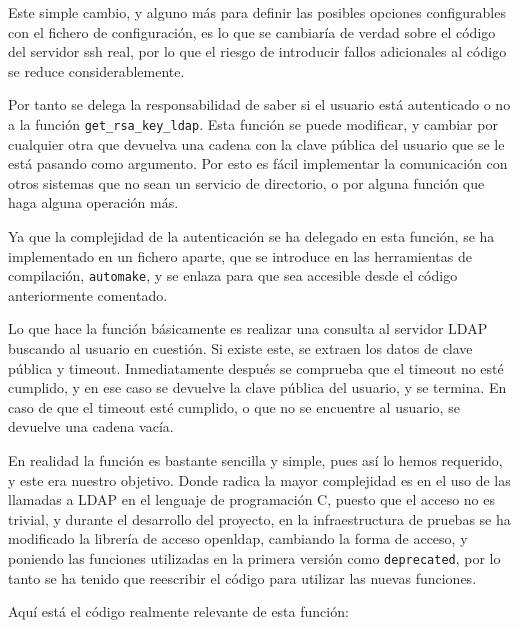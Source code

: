     Este simple cambio, y alguno más para definir las posibles opciones
    configurables con el fichero de configuración, es lo que se cambiaría
    de verdad sobre el código del servidor ssh real, por lo que el riesgo
    de introducir fallos adicionales al código se reduce considerablemente.

    Por tanto se delega la responsabilidad de saber si el usuario está
    autenticado o no a la función \texttt{get\_rsa\_key\_ldap}. Esta
    función se puede modificar, y cambiar por cualquier otra que devuelva
    una cadena con la clave pública del usuario que se le está pasando como
    argumento. Por esto es fácil implementar la comunicación con otros
    sistemas que no sean un servicio de directorio, o por alguna función
    que haga alguna operación más.

    Ya que la complejidad de la autenticación se ha delegado en esta
    función, se ha implementado en un fichero aparte, que se introduce en
    las herramientas de compilación, \texttt{automake}, y se enlaza para
    que sea accesible desde el código anteriormente comentado.

    Lo que hace la función básicamente es realizar una consulta al servidor
    LDAP buscando al usuario en cuestión. Si existe este, se extraen los
    datos de clave pública y timeout. Inmediatamente después se comprueba
    que el timeout no esté cumplido, y en ese caso se devuelve la clave
    pública del usuario, y se termina. En caso de que el timeout esté
    cumplido, o que no se encuentre al usuario, se devuelve una cadena
    vacía.

    En realidad la función es bastante sencilla y simple, pues así lo hemos
    requerido, y este era nuestro objetivo. Donde radica la mayor
    complejidad es en el uso de las llamadas a LDAP en el lenguaje de
    programación C, puesto que el acceso no es trivial, y durante el
    desarrollo del proyecto, en la infraestructura de pruebas se ha
    modificado la librería de acceso openldap, cambiando la forma de
    acceso, y poniendo las funciones utilizadas en la primera versión como
    \texttt{deprecated}, por lo tanto se ha tenido que reescribir el código
    para utilizar las nuevas funciones.

    Aquí está el código realmente relevante de esta función:

